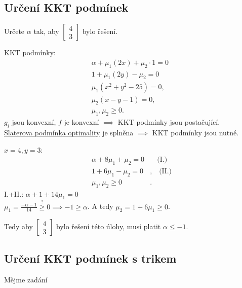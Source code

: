 \subsection{Určení KKT podmínek}
Určete $\alpha$ tak, aby 
$\begin{bmatrix}
    4 \\
    3
\end{bmatrix}$ bylo řešení.

KKT podmínky:
\begin{align*}
    \alpha + \mu_1 (2x) + \mu_2 \cdot 1 = 0\phantom{,} \\
    1 + \mu_1 (2y) - \mu_2 = 0\phantom{,} \\
    \mu_1(x^2 + y^2 - 25) = 0, \\
    \mu_2(x - y - 1) = 0, \\
    \mu_1, \mu_2 \geq 0.
\end{align*}
$g_i$ jsou konvexní, $f$ je konvexní $\implies$ KKT podmínky jsou postačující.\\
\hyperref[slaterPodm]{Slaterova podmínka optimality} je splněna $\implies$ KKT podmínky jsou nutné.

$x=4, y=3$:
\begin{align*}
    \alpha + 8 \mu_1 + \mu_2 = 0& \quad \text{(I.)}\\
    1 + 6 \mu_1 - \mu_2 = 0&, \quad \text{(II.)}\\
    \mu_1, \mu_2 \geq 0&.
\end{align*}
I.+II.: $\alpha + 1 + 14 \mu_1 = 0$\\
$\mu_1 = \frac{-\alpha - 1}{14} \overset{!}{\geq} 0 \implies -1 \geq \alpha$. A tedy $\mu_2 = 1 + 6 \mu_1 \geq 0$.

Tedy aby
$\begin{bmatrix}
    4 \\
    3
\end{bmatrix}$ bylo řešení této úlohy, musí platit $\alpha \leq -1$.

\subsection{Určení KKT podmínek s trikem}
Mějme zadání


